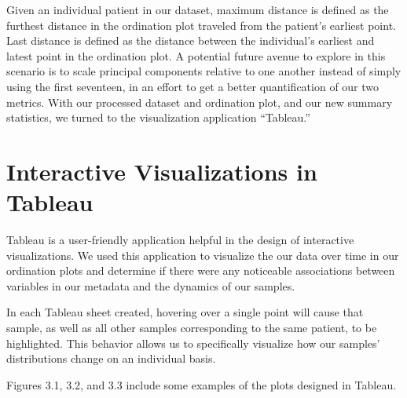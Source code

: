 \documentclass[12pt,twoside]{dukestatscithesis}
\begin{document}
Given an individual patient in our dataset, maximum distance is defined
as the furthest distance in the ordination plot traveled from the
patient's earliest point. Last distance is defined as the distance
between the individual's earliest and latest point in the ordination
plot. A potential future avenue to explore in this scenario is to scale
principal components relative to one another instead of simply using the
first seventeen, in an effort to get a better quantification of our two
metrics. With our processed dataset and ordination plot, and our new
summary statistics, we turned to the visualization application
``Tableau.''

\chapter{Interactive Visualizations in
Tableau}\label{interactive-visualizations-in-tableau}

Tableau is a user-friendly application helpful in the design of
interactive visualizations. We used this application to visualize the
our data over time in our ordination plots and determine if there were
any noticeable associations between variables in our metadata and the
dynamics of our samples.

In each Tableau sheet created, hovering over a single point will cause
that sample, as well as all other samples corresponding to the same
patient, to be highlighted. This behavior allows us to specifically
visualize how our samples' distributions change on an individual basis.

Figures 3.1, 3.2, and 3.3 include some examples of the plots designed in
Tableau.
\end{document}
